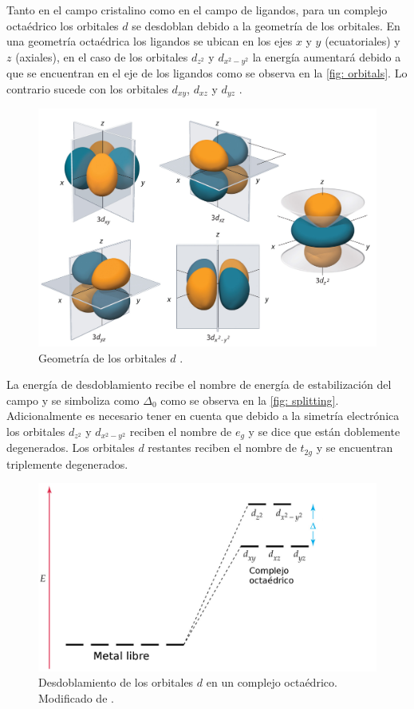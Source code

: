 \documentclass[fleqn,10pt]{SelfArx} %
\begin{document}
	Tanto en el campo cristalino como en el campo de ligandos, para un complejo octa\'edrico los orbitales $d$ se desdoblan debido a la geometr\'ia de los orbitales. En una geometr\'ia octa\'edrica los ligandos se ubican en los ejes $x$ y $y$ (ecuatoriales) y $z$ (axiales), en el caso de los orbitales $d_{z^2}$ y $d_{x^2-y^2}$ la energ\'ia aumentar\'a debido a que se encuentran en el eje de los ligandos como se observa en la \autoref{fig: orbitals}. Lo contrario sucede con los orbitales $d_{xy}$, $d_{xz}$ y $d_{yz}$ \cite{Orbitals}.
	\begin{figure}[h]
		\centering
		\includegraphics[width=0.8\linewidth]{images/orbitals.jpg}
		\caption{Geometr\'ia de los orbitales $d$ \cite{Orbitals}.}
		\label{fig: orbitals}
	\end{figure}
	\pagebreak
	
	La energ\'ia de desdoblamiento recibe el nombre de energ\'ia de estabilizaci\'on del campo y se simboliza como $\Delta_0$ como se observa en la \autoref{fig: splitting}. Adicionalmente es necesario tener en cuenta que debido a la simetr\'ia electr\'onica los orbitales $d_{z^2}$ y $d_{x^2-y^2}$ reciben el nombre de $e_g$ y se dice que est\'an doblemente degenerados. Los orbitales $d$ restantes reciben el nombre de $t_{2g}$ y se encuentran triplemente degenerados.
	\begin{figure}[h]
		\centering
		\includegraphics[width=\linewidth]{images/splitting.jpg}
		\caption{Desdoblamiento de los orbitales $d$ en un complejo octa\'edrico. Modificado de \cite{Orbitals}.}
		\label{fig: splitting}
	\end{figure}
	
\end{document}

